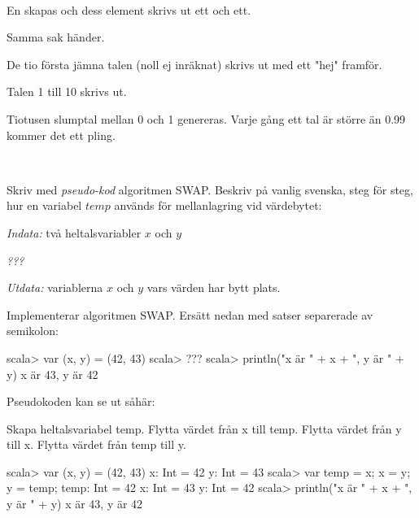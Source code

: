 \Subtask {}\\


\SOLUTION


\TaskSolved \what
 

\SubtaskSolved  En  skapas och dess element skrivs ut ett och ett.

\SubtaskSolved  Samma sak händer.

\SubtaskSolved  De tio första jämna talen (noll ej inräknat) skrivs ut med ett "hej" framför.

\SubtaskSolved  Talen 1 till 10 skrivs ut.

\SubtaskSolved  Tiotusen slumptal mellan 0 och 1 genereras. Varje gång ett tal är större än 0.99 kommer det ett pling.



\QUESTEND









\QUESTBEGIN

\Task  \what~ 

\Subtask Skriv med \emph{pseudo-kod} algoritmen SWAP. Beskriv på vanlig svenska, steg för steg, hur en variabel $temp$ används för mellanlagring vid värdebytet:

\emph{Indata:} två heltalsvariabler $x$ och $y$

\emph{???}

\emph{Utdata:} variablerna $x$ och $y$ vars värden har bytt plats.

\Subtask Implementerar algoritmen SWAP. Ersätt  nedan med satser separerade av semikolon:

\begin{REPL}
scala> var (x, y) = (42, 43)
scala> ???
scala> println("x är " + x + ", y är " + y)
x är 43, y är 42
\end{REPL}



\SOLUTION


\TaskSolved \what
 

\SubtaskSolved  Pseudokoden kan se ut såhär:

Skapa heltalsvariabel temp. 
Flytta värdet från x till temp. 
Flytta värdet från y till x. 
Flytta värdet från temp till y.

\SubtaskSolved 
\begin{REPLnonum}
scala> var (x, y) = (42, 43)
x: Int = 42
y: Int = 43
scala> var temp = x; x = y; y = temp;
temp: Int = 42
x: Int = 43
y: Int = 42
scala> println("x är " + x + ", y är " + y)
x är 43, y är 42
\end{REPLnonum}



